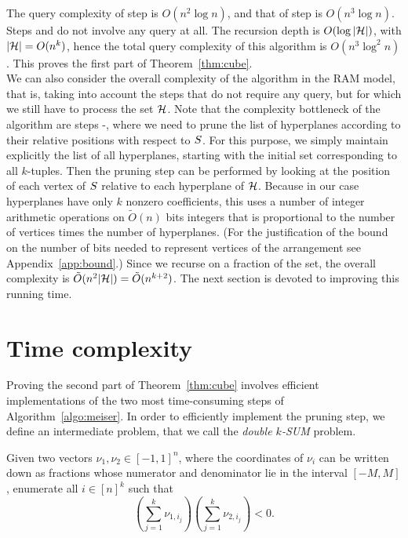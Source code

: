 The query complexity of step  is $O(n^2 \log n)$, and that of step
 is $O(n^3 \log n)$. Steps  and  do not involve any
query at all. The recursion depth is $O(\log |{\mathcal{H}}|)$, with $|\mathcal{H}|=O(n^k)$,
hence the total query complexity of this algorithm is $O(n^3 \log^2 n)$. This
proves the first part of Theorem~\ref{thm:cube}.\\

We can also consider the overall complexity of the algorithm in the RAM model,
that is, taking into account the steps that do not require any query, but for
which we still have to process the set $\mathcal{H}$. Note that the complexity
bottleneck of the algorithm are steps -, where we need to prune
the list of hyperplanes according to their relative positions with respect to
$S$. For this purpose, we simply maintain explicitly the list of all
hyperplanes, starting with the initial set corresponding to all $k$-tuples.
Then the pruning step can be performed by looking at the position of each
vertex of $S$ relative to each hyperplane of $\mathcal{H}$.
Because in our case hyperplanes have only $k$ nonzero coefficients, this uses a
number of integer arithmetic operations on $\tilde{O}(n)$ bits integers that is
proportional to the number of vertices times the number of hyperplanes.
(For the justification of the bound on the number of bits needed to represent
vertices of the arrangement see Appendix~\ref{app:bound}.)
Since we recurse on a fraction of the set, the overall complexity is
$\tilde{O}(n^2|{\mathcal{H}}|) = \tilde{O}(n^{k+2})$. The next section is devoted
to improving this running time.


\section{Time complexity}
\label{sec:time-complexity}

Proving the second part of Theorem~\ref{thm:cube} involves efficient implementations of
the two most time-consuming steps of Algorithm~\ref{algo:meiser}.
In order to efficiently implement the pruning
step, we define an intermediate problem, that we call the \emph{double $k$-SUM}
problem.
\begin{problem}
	Given two vectors $\nu_1, \nu_2 \in {[-1,1]}^n$, where the coordinates of
	$\nu_i$ can be written down as fractions whose numerator and denominator
	lie in the interval $[-M,M]$, enumerate all
	$i\in {[n]}^k$ such that
	$$
	\left(\sum_{j=1}^{k} \nu_{1,i_j}\right)
	\left(\sum_{j=1}^{k} \nu_{2,i_j}\right)
	< 0.
	$$
\end{problem}


